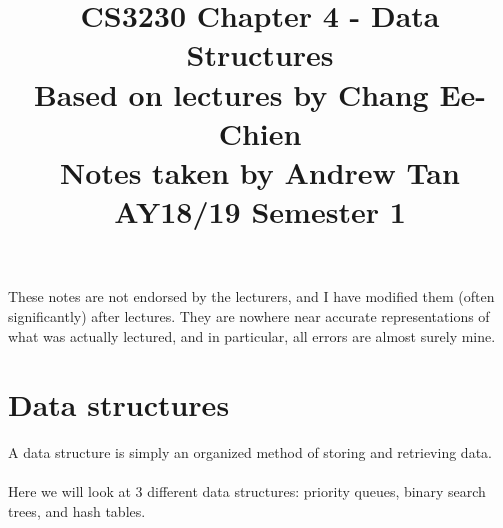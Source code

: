 \documentclass[a4paper]{article}
\title{%
	CS3230 Chapter 4 - Data Structures \\
	\large Based on lectures by Chang Ee-Chien
	\\ Notes taken by Andrew Tan
	\\ AY18/19 Semester 1
	\\ }
\author{}
\date{\vspace{-5ex}}
\begin{document}
\maketitle

\begin{center}\begin{minipage}[c]{0.9\textwidth}\centering\footnotesize These notes are not endorsed by the lecturers, and I have modified them (often significantly) after lectures. They are nowhere near accurate representations of what was actually lectured, and in particular, all errors are almost surely mine.\end{minipage}\end{center}

\section{Data structures}
A data structure is simply an organized method of storing and retrieving data. \\ \\Here we will look at 3 different data structures: priority queues, binary search trees, and hash tables.
\end{document}
